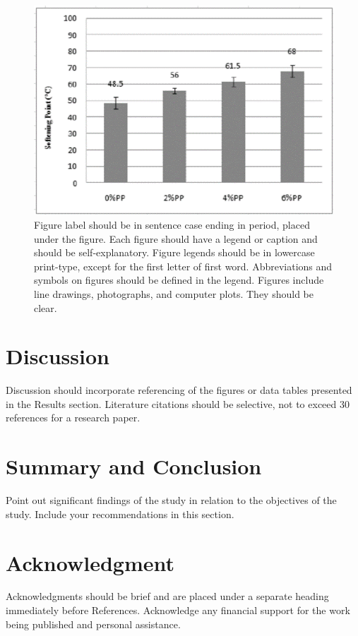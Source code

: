 \documentclass{strrespaper-journ}
\begin{document}
	        \begin{figure}[htbp]
	            \centering
	            \includegraphics[width=\linewidth]{../sample/graphics/bar_graph}
	            \caption{
					Figure label should be in sentence case ending in period, placed under the figure.
					Each figure should have a legend or caption and should be self-explanatory.
					Figure legends should be in lowercase print-type, except for the first letter of first word.
					Abbreviations and symbols on figures should be defined in the legend.
					Figures include line drawings, photographs, and computer plots.
					They should be clear.
				}
	            \label{fig:bar_graph}
	        \end{figure}

    \section{Discussion}
		Discussion should incorporate referencing of the figures or data tables presented in the Results section.
		Literature citations should be selective, not to exceed 30 references for a research paper.

    \section{Summary and Conclusion}
		Point out significant findings of the study in relation to the objectives of the study.
		Include your recommendations in this section.

    \section{Acknowledgment}
		Acknowledgments should be brief and are placed under a separate heading immediately before References.
		Acknowledge any financial support for the work being published and personal assistance.
\end{document}
